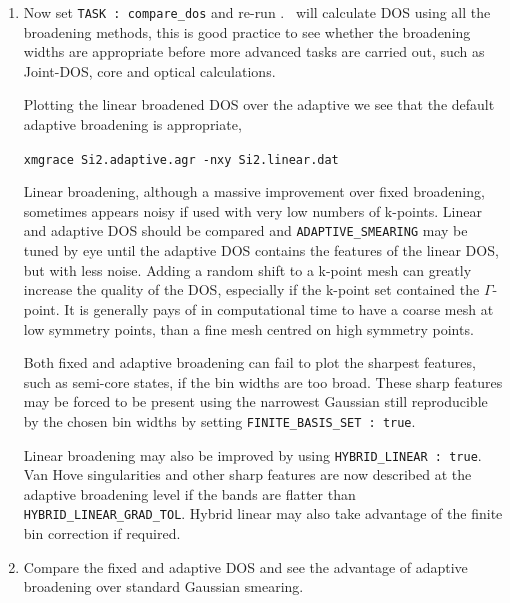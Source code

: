 \documentclass[a4paper,11pt,twoside]{book}
\begin{document}
{\begin{enumerate}
\item  Now set {\tt TASK : compare\_dos} and re-run \optados. \optados\ will calculate DOS using all the broadening methods, this is good practice to see whether the broadening widths are appropriate before more advanced tasks are carried out, such as Joint-DOS, core and optical calculations.

Plotting the linear broadened DOS over the adaptive we see that the default adaptive broadening is appropriate,

\verb#xmgrace Si2.adaptive.agr -nxy Si2.linear.dat#

Linear broadening, although a massive improvement over fixed broadening, sometimes appears noisy if used with very low numbers of k-points. Linear and adaptive DOS should be compared and \verb#ADAPTIVE_SMEARING# may be tuned by eye until the adaptive DOS contains the features of the linear DOS, but with less noise.  Adding a random shift to a k-point mesh can greatly increase the quality of the DOS, especially if the k-point set contained the $\Gamma$-point. It is generally pays of in computational time to have a coarse mesh at low symmetry points, than a fine mesh centred on high symmetry points. 

Both fixed and adaptive broadening can fail to plot the sharpest features, such as semi-core states, if the bin widths are too broad. These sharp features may be forced to be present using the narrowest Gaussian still reproducible by the chosen bin widths by setting \verb#FINITE_BASIS_SET : true#.  

Linear broadening may also be improved by using \verb#HYBRID_LINEAR : true#. Van Hove singularities and other sharp features are now described at the adaptive broadening level if the bands are flatter than \verb#HYBRID_LINEAR_GRAD_TOL#. Hybrid linear may also take advantage of the finite bin correction if required.

\item Compare the fixed and adaptive DOS and see the advantage of adaptive broadening over standard Gaussian smearing.

\end{enumerate}


}
\end{document}
